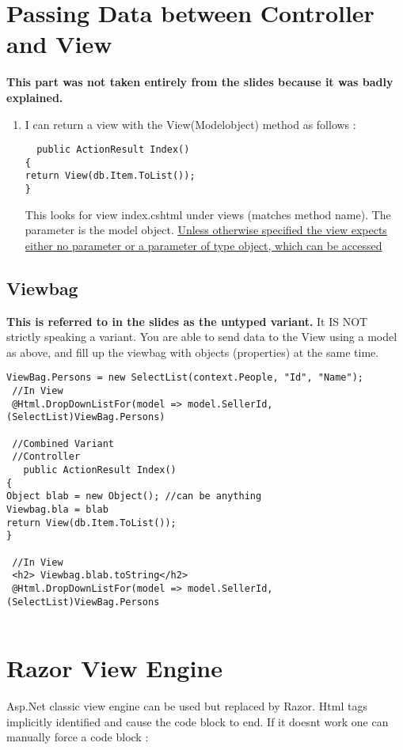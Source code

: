 \documentclass[a4paper,10pt]{scrreprt}
\begin{document}
\section{Passing Data between Controller and View}
\textbf{This part was not taken entirely from the slides because it was badly explained.}
\begin{enumerate}
 \item I can return a view with the View(Modelobject) method as follows :
 \begin{verbatim}
  public ActionResult Index()
{
return View(db.Item.ToList());
}
 \end{verbatim}
 This looks for view index.cshtml under views (matches method name). The parameter is the model object. 
\underline{Unless otherwise specified 
the view expects either no parameter or a parameter of type object, which can be accessed}

\end{enumerate}

\subsection{Viewbag}
\textbf{This is referred to in the slides as the untyped variant.} It IS NOT strictly speaking a variant. You are able 
to send data to the View using a model as above, and fill up the viewbag with objects (properties) at the same time.
\begin{lstlisting}[caption=ViewBag Example]
 ViewBag.Persons = new SelectList(context.People, "Id", "Name");
 //In View
 @Html.DropDownListFor(model => model.SellerId, (SelectList)ViewBag.Persons)
 
 //Combined Variant
 //Controller
   public ActionResult Index()
{
Object blab = new Object(); //can be anything
Viewbag.bla = blab
return View(db.Item.ToList());
}

 //In View
 <h2> Viewbag.blab.toString</h2>
 @Html.DropDownListFor(model => model.SellerId, (SelectList)ViewBag.Persons
 

\end{lstlisting}

\section{Razor View Engine}
Asp.Net classic view engine can be used but replaced by Razor.
Html tags implicitly identified and cause the code block to end.
If it doesnt work one can manually force a code block :
\end{document}

